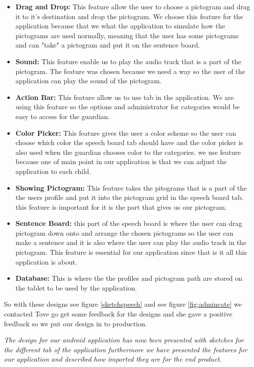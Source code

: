 \begin{itemize}
	\item \textbf{Drag and Drop:} This feature allow the user to choose a pictogram and drag it to it's destination and drop the pictogram.  We choose this feature for the application because that we what the application to simulate how the pictograms are used normally, meaning that the user has some pictograms and can "take" a pictogram and put it on the sentence board.  
	\item \textbf{Sound:} This feature enable us to play the audio track that is a part of the pictogram. The feature was chosen because we need a way so the user of the application can play the sound of the pictogram. 
	\item \textbf{Action Bar:} This feature allow us to use tab in the application. We are using this feature so the options and administrator for categories would be easy to access for the guardian. 
	\item \textbf{Color Picker:} This feature gives the user a color scheme so the user can choose which color the speech board tab should have and the color picker is also used when the guardian chooses color to the categories. we use feature because one of main point in our application is that we can adjust the application to each child. 
	\item \textbf{Showing Pictogram:} This feature takes the pitograms that is a part of the the users profile and put it into the pictogram grid in the speech board tab. this feature is important for it is the part that gives us our pictogram. 
	\item \textbf{Sentence Board:} this part of the speech board is where the user can drag pictogram down onto and arrange the chosen pictograms so the user can make a sentence and it is also where the user can play the audio track in the pictogram. This feature is essential for our application since that is it all this application is about. 
	\item \textbf{Database:} This is where the the profiles and pictogram path are stored on the tablet to be used by the application.
\end{itemize}

So with these designs see figure \ref{sketchspeech} and see figure \ref{fig:admincate} we contacted Tove go get some feedback for the designs and she gave a positive feedback so we put our design in to production.  

\textit{The design for our android application has now been presented with sketches for the different tab of the application furthermore we have presented the  features for our application and described how imported they are for the end product.} 